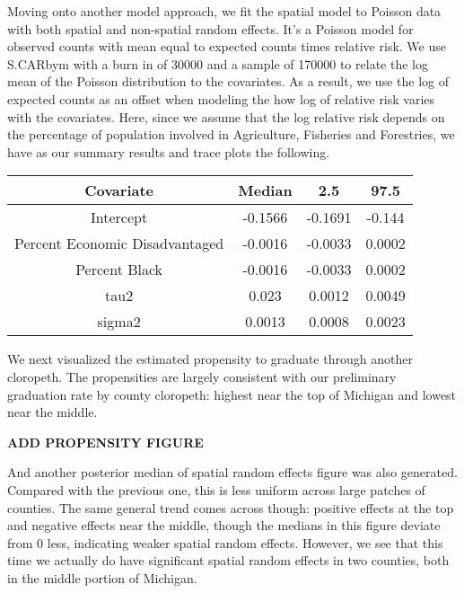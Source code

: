 \documentclass[12pt,letterpaper]{article}
\begin{document}
Moving onto another model approach, we fit the spatial model to Poisson data with both spatial and non-spatial random effects. It's a Poisson model for observed counts with mean equal to expected counts times relative risk. We use S.CARbym with a burn in of 30000 and a sample of 170000 to relate the log mean of the Poisson distribution to the covariates. As a result, we use the log of expected counts as an offset when modeling the how log of relative risk varies with the covariates. Here, since we assume that the log relative risk depends on the percentage of population involved in Agriculture, Fisheries and Forestries, we have as our summary results and trace plots the following. 

\begin{center}
 \begin{tabular}{||c c c c||} 
 \hline
 Covariate & Median & 2.5 & 97.5 \\ [0.5ex] 
 \hline\hline
 Intercept & -0.1566 & -0.1691 & -0.144 \\ 
 \hline
 Percent Economic Disadvantaged & -0.0016 & -0.0033 & 0.0002 \\
 \hline
 Percent Black & -0.0016 & -0.0033 & 0.0002 \\
 \hline
 tau2 & 0.023 & 0.0012 & 0.0049 \\ 
\hline
 sigma2 & 0.0013 & 0.0008 & 0.0023 \\ [0.5ex] 
 \hline
\end{tabular}
\end{center}


We next visualized the estimated propensity to graduate through another cloropeth. The propensities are largely consistent with our preliminary graduation rate by county cloropeth: highest near the top of Michigan and lowest near the middle. 

\begin{center}
\LARGE\textbf{ADD PROPENSITY FIGURE}
\end{center}

And another posterior median of spatial random effects figure was also generated. Compared with the previous one, this is less uniform across large patches of counties. The same general trend comes across though: positive effects at the top and negative effects near the middle, though the medians in this figure deviate from 0 less, indicating weaker spatial random effects. However, we see that this time we actually do have significant spatial random effects in two counties, both in the middle portion of Michigan.
\end{document}
